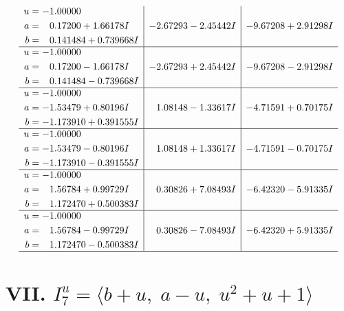\documentclass[1p]{elsarticle_modified}
\theoremstyle{definition}
\begin{document}
$$\begin{array}{c|c|c}
\begin{aligned}
u &= -1.00000\phantom{ +0.000000I} \\
a &= \phantom{-}0.17200 + 1.66178 I \\
b &= \phantom{-}0.141484 + 0.739668 I\end{aligned}
 & -2.67293 - 2.45442 I & -9.67208 + 2.91298 I \\ \hline\begin{aligned}
u &= -1.00000\phantom{ +0.000000I} \\
a &= \phantom{-}0.17200 - 1.66178 I \\
b &= \phantom{-}0.141484 - 0.739668 I\end{aligned}
 & -2.67293 + 2.45442 I & -9.67208 - 2.91298 I \\ \hline\begin{aligned}
u &= -1.00000\phantom{ +0.000000I} \\
a &= -1.53479 + 0.80196 I \\
b &= -1.173910 + 0.391555 I\end{aligned}
 & \phantom{-}1.08148 - 1.33617 I & -4.71591 + 0.70175 I \\ \hline\begin{aligned}
u &= -1.00000\phantom{ +0.000000I} \\
a &= -1.53479 - 0.80196 I \\
b &= -1.173910 - 0.391555 I\end{aligned}
 & \phantom{-}1.08148 + 1.33617 I & -4.71591 - 0.70175 I \\ \hline\begin{aligned}
u &= -1.00000\phantom{ +0.000000I} \\
a &= \phantom{-}1.56784 + 0.99729 I \\
b &= \phantom{-}1.172470 + 0.500383 I\end{aligned}
 & \phantom{-}0.30826 + 7.08493 I & -6.42320 - 5.91335 I \\ \hline\begin{aligned}
u &= -1.00000\phantom{ +0.000000I} \\
a &= \phantom{-}1.56784 - 0.99729 I \\
b &= \phantom{-}1.172470 - 0.500383 I\end{aligned}
 & \phantom{-}0.30826 - 7.08493 I & -6.42320 + 5.91335 I\\
 \hline 
 \end{array}$$\newpage\newpage\renewcommand{\arraystretch}{1}
\centering \section*{VII. $I^u_{7}= \langle b+u,\;a- u,\;u^2+u+1 \rangle$}
\end{document}
